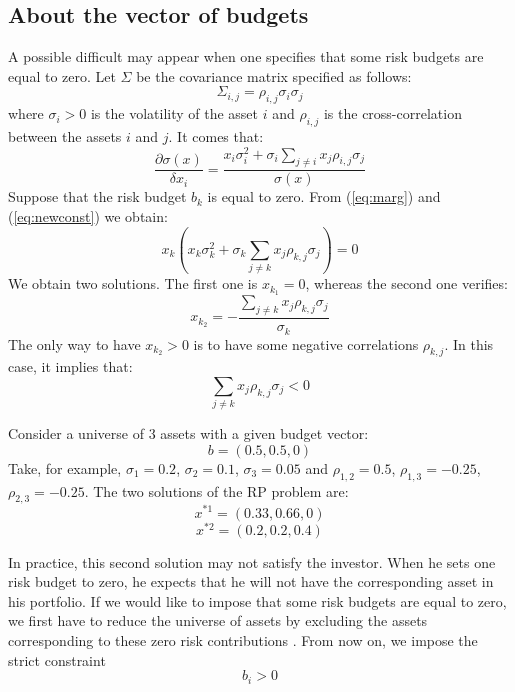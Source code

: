 \subsection{About the vector of budgets}
A possible difficult may appear when one specifies that some risk budgets are equal to zero. Let $\Sigma$ be the covariance matrix specified as follows:
\begin{equation}
\Sigma_{i,j} = \rho_{i,j}\sigma_i \sigma_j
\end{equation}
where $\sigma_i > 0$ is the volatility of the asset $i$ and $\rho_{i,j}$ is the cross-correlation between the assets $i$ and $j$. It comes that:
\begin{equation}
\frac{\partial \sigma(x)}{\delta x_i} = \frac{x_i \sigma_i^2 + \sigma_i \sum_{j \neq i} x_j \rho_{i,j} \sigma_j}{\sigma(x)}
\end{equation}
Suppose that the risk budget $b_k$ is equal to zero. From (\ref{eq:marg}) and (\ref{eq:newconst}) we obtain:
\begin{equation}
x_k\left( x_k \sigma_k^2 + \sigma_k \sum_{j \neq k} x_j \rho_{k,j} \sigma_j\right) = 0
\end{equation}
We obtain two solutions. The first one is $x_{k_1} = 0$, whereas the second one verifies:
\begin{equation}
x_{k_2} = - \frac{\sum_{j \neq k}x_j \rho_{k,j} \sigma_j}{\sigma_k}
\end{equation}
The only way to have $x_{k_2} > 0$ is to have some negative correlations $\rho_{k,j}$. In this case, it implies that:
\begin{equation}
\sum_{j \neq k}x_j \rho_{k,j} \sigma_j <0
\end{equation}
\begin{example}
Consider a universe of $3$ assets with a given budget vector:
\begin{equation*}
b=(0.5,0.5, 0)
\end{equation*}
Take, for example, $\sigma_1 = 0.2$, $\sigma_2 = 0.1$, $\sigma_3 = 0.05$ and $\rho_{1,2} = 0.5$, $\rho_{1,3} = -0.25$, $\rho_{2,3} = -0.25$. The two solutions of the RP problem are:
\begin{equation*}
x^{*1} = (0.33, 0.66, 0)
\end{equation*}
\begin{equation*}
x^{*2} = (0.2, 0.2, 0.4)
\end{equation*}
\end{example}
In practice, this second solution may not satisfy the investor. When he sets one risk budget to zero, he expects that he will not have the corresponding asset in his portfolio. If we would like to impose that some risk budgets are equal to zero, we first have to reduce the universe of assets by excluding the assets corresponding to these zero risk contributions \cite{intr}. From now on, we impose the strict constraint
\begin{equation}
b_i >0
\end{equation}

